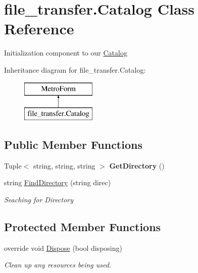 \hypertarget{classfile__transfer_1_1_catalog}{}\section{file\+\_\+transfer.\+Catalog Class Reference}
\label{classfile__transfer_1_1_catalog}


Initialization component to our \hyperlink{classfile__transfer_1_1_catalog}{Catalog}  


Inheritance diagram for file\+\_\+transfer.\+Catalog\+:\begin{figure}[H]
\begin{center}
\leavevmode
\includegraphics[height=2.000000cm]{classfile__transfer_1_1_catalog}
\end{center}
\end{figure}
\subsection*{Public Member Functions}
\begin{DoxyCompactItemize}
\item 
\mbox{\label{classfile__transfer_1_1_catalog_a66d24a8eeb91d8290881f1bd8fe8d3f2}} 
Tuple$<$ string, string, string $>$ {\bfseries Get\+Directory} ()
\item 
string \hyperlink{classfile__transfer_1_1_catalog_a1e11d08f9a595a80a06c734a074461ce}{Find\+Directory} (string direc)
\begin{DoxyCompactList}\small\item\em Seaching for Directory \end{DoxyCompactList}\end{DoxyCompactItemize}
\subsection*{Protected Member Functions}
\begin{DoxyCompactItemize}
\item 
override void \hyperlink{classfile__transfer_1_1_catalog_aef867e6cdacf39f94ccf2769798196ef}{Dispose} (bool disposing)
\begin{DoxyCompactList}\small\item\em Clean up any resources being used. \end{DoxyCompactList}\end{DoxyCompactItemize}


